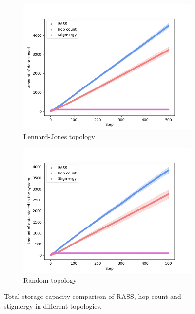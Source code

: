 \begin{figure}
\begin{subfigure}{0.48\textwidth}
        \includegraphics[width=\textwidth]{figures/dora_mesh/lennard_storage.png}
        \caption{Lennard-Jones topology}
        \label{results:lennard_100_storage}
    \end{subfigure}
    \begin{subfigure}{0.48\textwidth}
        \includegraphics[width=\textwidth]{figures/dora_mesh/random_storage.png}
        \caption{Random topology}
        \label{results:random_100_storage}
    \end{subfigure}
    \caption[RASS total storage]{Total storage capacity comparison of \ac{RASS}, hop count and stigmergy in different topologies.}
    \label{results:rass_storage}
\end{figure}

